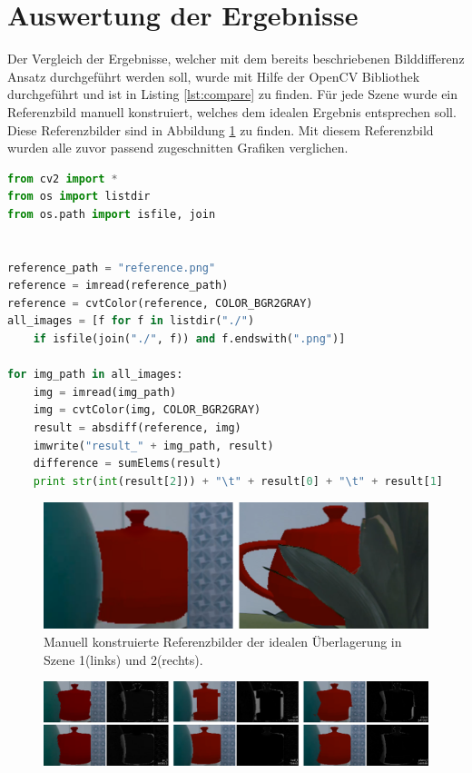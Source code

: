 \section{Auswertung der Ergebnisse}

Der Vergleich der Ergebnisse, welcher mit dem bereits beschriebenen Bilddifferenz Ansatz durchgeführt werden soll, wurde mit Hilfe der OpenCV Bibliothek durchgeführt und ist in Listing \ref{lst:compare} zu finden. Für jede Szene wurde ein Referenzbild manuell konstruiert, welches dem idealen Ergebnis entsprechen soll. Diese Referenzbilder sind in Abbildung \ref{fig:reference} zu finden. Mit diesem Referenzbild wurden alle zuvor passend zugeschnitten Grafiken verglichen.


\begin{lstlisting}[mathescape,caption=Implementierung der Bilddifferenz, label=lst:compare, language=Python]
from cv2 import *
from os import listdir
from os.path import isfile, join


reference_path = "reference.png"
reference = imread(reference_path)
reference = cvtColor(reference, COLOR_BGR2GRAY)
all_images = [f for f in listdir("./") 
    if isfile(join("./", f)) and f.endswith(".png")]
    
for img_path in all_images:
    img = imread(img_path)
    img = cvtColor(img, COLOR_BGR2GRAY)
    result = absdiff(reference, img)
    imwrite("result_" + img_path, result)
    difference = sumElems(result)
    print str(int(result[2])) + "\t" + result[0] + "\t" + result[1]
\end{lstlisting}

\begin{figure}[h]
  \centering
	\includegraphics[width=.9\textwidth]{content/images/evaluation/reference.png} 
  \caption{Manuell konstruierte Referenzbilder der idealen Überlagerung in Szene 1(links) und 2(rechts).}
  \label{fig:reference}
\end{figure}

\begin{figure}[h]
  \centering
	\includegraphics[width=1.0\textwidth]{content/images/evaluation/static_occlusion_results.png} 
  \caption{}
  \label{fig:static_occlusion_results}
\end{figure}

